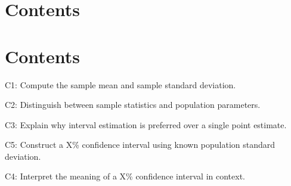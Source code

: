


\section*{Contents}
\setcounter{tocdepth}{2}
\setcounter{secnumdepth}{1}
\section*{Contents}
\setcounter{tocdepth}{2}
\setcounter{secnumdepth}{1}
\tableofcontents
	\begin{ExamCriteria}
		\item C1: Compute the sample mean and sample standard deviation.
		\item C2: Distinguish between sample statistics and population parameters.
		\item C3: Explain why interval estimation is preferred over a single point estimate.
		\item C5: Construct a X\% confidence interval using known population standard deviation.
		\item C4: Interpret the meaning of a X\% confidence interval in context.
	\end{ExamCriteria}
	
